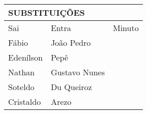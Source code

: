 \begin{table}[H]
\begin{tabular}{|lll|}
\hline
\multicolumn{3}{|l|}{\textbf{SUBSTITUIÇÕES}}                                  \\ \hline
\multicolumn{1}{|l|}{Sai}       & \multicolumn{1}{l|}{Entra}         & Minuto \\ \hline
\multicolumn{1}{|l|}{Fábio}     & \multicolumn{1}{l|}{João Pedro}    &        \\ \hline
\multicolumn{1}{|l|}{Edenílson} & \multicolumn{1}{l|}{Pepê}          &        \\ \hline
\multicolumn{1}{|l|}{Nathan}    & \multicolumn{1}{l|}{Gustavo Nunes} &        \\ \hline
\multicolumn{1}{|l|}{Soteldo}   & \multicolumn{1}{l|}{Du Queiroz}    &        \\ \hline
\multicolumn{1}{|l|}{Cristaldo} & \multicolumn{1}{l|}{Arezo}         &        \\ \hline
\end{tabular}
\end{table}